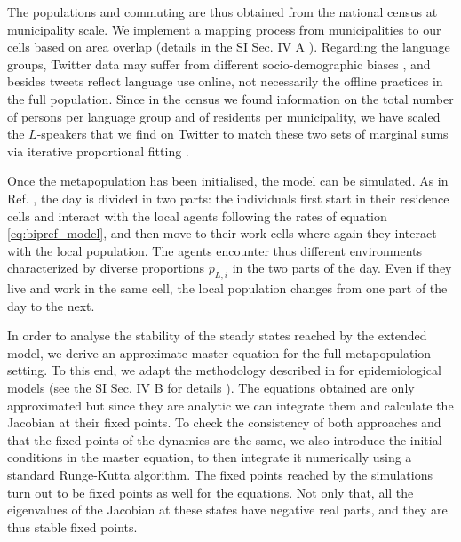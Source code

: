 \documentclass[../thesis.tex]{subfiles}
\begin{document}
The populations and commuting are thus obtained from the national census at municipality
scale. We implement a mapping process from
municipalities to our cells based on area overlap (details in the SI Sec. IV A
\cite{supp}). Regarding the language groups, Twitter data may suffer from different
socio-demographic biases
\cite{MisloveUnderstandingDemographics2011,NguyenAudienceUse2015}, and besides tweets
reflect language use online, not necessarily the offline practices in the full
population. Since in the census we found information on the total number of persons per
language group and of residents per municipality, we have scaled the $L$-speakers that
we find on Twitter to match these two sets of marginal sums via iterative proportional
fitting \cite{DemingLeastSquares1940,FienbergIterativeProcedure1970}.

Once the metapopulation has been initialised, the model can be simulated. As in Ref.
\cite{Fernandez-GraciaVoterModel2014}, the day is divided in two parts: the individuals
first start in their residence cells and interact with the local agents following the
rates of equation \eqref{eq:bipref_model}, and then move to their work cells where again
they interact with the local population. The agents encounter thus different
environments characterized by diverse proportions $p_{L,i}$ in the two parts of the day.
Even if they live and work in the same cell, the local population changes from one part
of the day to the next.

In order to analyse the stability of the steady states reached by the extended model, we
derive an approximate master equation for the full metapopulation setting. To this end,
we adapt the methodology described in 
\cite{SattenspielStructuredEpidemic1995,BalcanModelingSpatial2010} for epidemiological
models (see the SI Sec. IV B for details \cite{supp}). The equations obtained are only
approximated but since they are analytic we can integrate them and calculate the
Jacobian at their fixed points. To check the consistency of both approaches and that the
fixed points of the dynamics are the same, we also introduce the initial conditions in
the master equation, to then integrate it numerically using a standard Runge-Kutta
algorithm. The fixed points reached by the simulations turn out to be fixed points as
well for the equations. Not only that, all the eigenvalues of the Jacobian at these
states have negative real parts, and they are thus stable fixed points.
\end{document}
